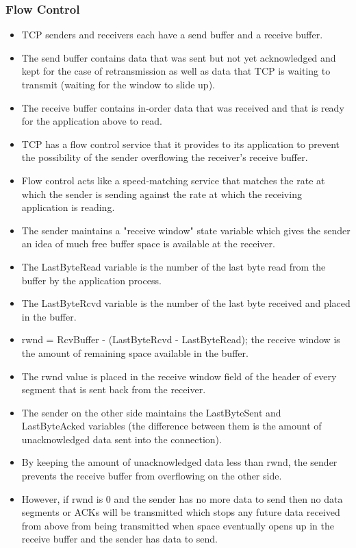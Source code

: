\documentclass{article}
\begin{document}
\subsubsection{Flow Control}

\begin{itemize}
    \item TCP senders and receivers each have a send buffer and a receive buffer.
    \item The send buffer contains data that was sent but not yet acknowledged and kept for the case of retransmission as well as data that TCP is waiting to transmit (waiting for the window to slide up).
    \item The receive buffer contains in-order data that was received and that is ready for the application above to read.
    \item TCP has a flow control service that it provides to its application to prevent the possibility of the sender overflowing the receiver's receive buffer.
    \item Flow control acts like a speed-matching service that matches the rate at which the sender is sending against the rate at which the receiving application is reading.
    \item The sender maintains a "receive window" state variable which gives the sender an idea of much free buffer space is available at the receiver.
    \item The LastByteRead variable is the number of the last byte read from the buffer by the application process.
    \item The LastByteRcvd variable is the number of the last byte received and placed in the buffer.
    \item rwnd = RcvBuffer - (LastByteRcvd - LastByteRead); the receive window is the amount of remaining space available in the buffer.
    \item The rwnd value is placed in the receive window field of the header of every segment that is sent back from the receiver.
    \item The sender on the other side maintains the LastByteSent and \\ LastByteAcked variables (the difference between them is the amount of unacknowledged data sent into the connection).
    \item By keeping the amount of unacknowledged data less than rwnd, the sender prevents the receive buffer from overflowing on the other side.
    \item However, if rwnd is 0 and the sender has no more data to send then no data segments or ACKs will be transmitted which stops any future data received from above from being transmitted when space eventually opens up in the receive buffer and the sender has data to send.

\end{itemize}
\end{document}
